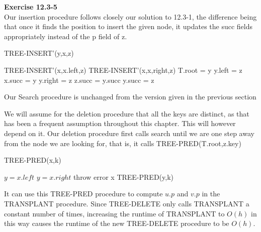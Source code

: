 \documentclass{article}
\begin{document}

\noindent\textbf{ Exercise 12.3-5} \\

Our insertion procedure follows closely our solution to 12.3-1, the difference being that once it finds the position to insert the given node, it updates the succ fields appropriately instead of the p field of z.

\begin{algorithm}
\caption{TREE-INSERT'(y,x,z)}
\begin{algorithmic}
\State TREE-INSERT'(x,x.left,z)
\Else
\State TREE-INSERT'(x,x,right,z)
\EndIf
\EndIf
{}
\State T.root = y
\State y.left = z
\State x.succ = y
\Else
\State y.right = z
\State z.succ = y.succ
\State y.succ = z
\EndIf
\end{algorithmic}
\end{algorithm}

Our Search procedure is unchanged from the version given in the previous section

We will assume for the deletion procedure that all the keys are distinct, as that has been a frequent assumption throughout this chapter. This will however depend on it. Our deletion procedure first calls search until we are one step away from the node we are looking for, that is, it calls TREE-PRED(T.root,z.key)

\begin{algorithm}
\caption{TREE-PRED(x,k)}
\begin{algorithmic}
\State $y = x.left$
\Else
\State $y = x.right$
\EndIf
{}
\State throw error
\State \Return x
\Else
\State \Return TREE-PRED(y,k)
\EndIf
\end{algorithmic}
\end{algorithm}

It can use this TREE-PRED procedure to compute $u.p$ and $v.p$ in the TRANSPLANT procedure. Since TREE-DELETE only calls TRANSPLANT a constant number of times, increasing the runtime of TRANSPLANT to $O(h)$ in this way causes the runtime of the new TREE-DELETE procedure to be $O(h)$.\\
\end{document}
